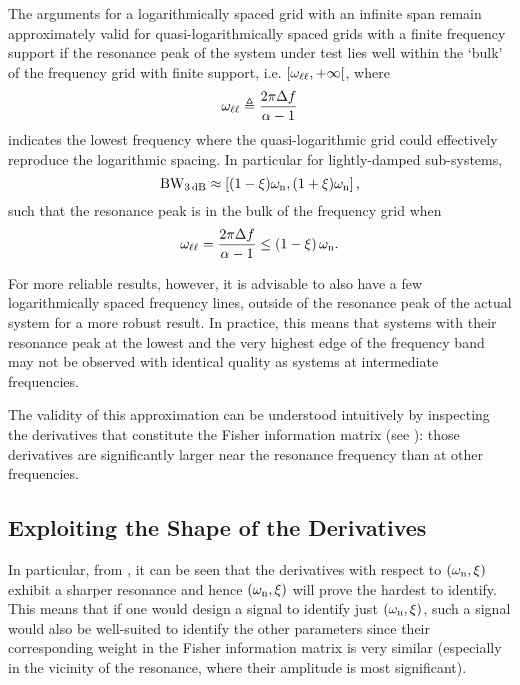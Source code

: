   The arguments for a logarithmically spaced grid with an infinite span remain approximately valid for quasi-logarithmically spaced grids with a finite frequency support if the resonance peak of the system under test lies well within the `bulk' of the frequency grid with finite support, i.e. $\left[ \omega_{\ell \ell}, +\infty \right[$, where
  \begin{equation}
    \omega_{\ell \ell} \triangleq \frac{2\pi \Delta f}{\alpha - 1}
    \label{eq:excitation:linearLogTransitionFrequency}
  \end{equation}
  indicates the lowest frequency where the quasi-logarithmic grid could effectively reproduce the logarithmic spacing.
  In particular for lightly-damped sub-systems, 
  \begin{equation}
  \mathrm{BW}_{3\,\mathrm{dB}} \approx \left[ (1-\xi_{})\omega_{\mathrm{n}}, (1+\xi_{})\omega_{\mathrm{n}} \right]
  \text{,}
  \end{equation}
  such that the resonance peak is in the bulk of the frequency grid when
  \begin{equation} 
    \omega_{\ell \ell} =\frac{2 \pi \Delta f}{\alpha -1} \leq \left( 1 - \xi_{} \right) \omega_{\mathrm{n}}
    \text{.}
    \label{eq:excitation:systemInBulk:generic}
  \end{equation}

  For more reliable results, however, it is advisable to also have a few logarithmically spaced frequency lines, outside of the resonance peak of the actual system for a more robust result.
  In practice, this means that systems with their resonance peak at the lowest and the very highest edge of the frequency band may not be observed with identical quality as systems at intermediate frequencies.

  The validity of this approximation can be understood intuitively by inspecting the derivatives that constitute the Fisher information matrix (see ): those derivatives are significantly larger near the resonance frequency than at other frequencies.

  \subsection{Exploiting the Shape of the Derivatives}
   In particular, from , it can be seen that the derivatives with respect to $(\omega_{\mathrm{n}}, \xi_{})$ exhibit a sharper resonance and hence $(\omega_{\mathrm{n}}, \xi_{})$ will prove the hardest to identify.
   This means that if one would design a signal to identify just $(\omega_{\mathrm{n}}, \xi_{})$, such a signal would also be well-suited to identify the other parameters since their corresponding weight in the Fisher information matrix is very similar (especially in the vicinity of the resonance, where their amplitude is most significant).

